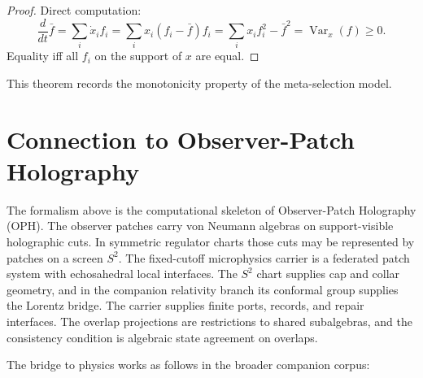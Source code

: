 \documentclass[11pt]{article}
\theoremstyle{remark}
\theoremstyle{plain}
\begin{document}
\begin{proof}
Direct computation:
\[
\frac{d}{dt}\bar{f}
=
\sum_i \dot{x}_i f_i
=
\sum_i x_i(f_i - \bar{f})f_i
=
\sum_i x_i f_i^2 - \bar{f}^2
=
\operatorname{Var}_x(f) \ge 0.
\]
Equality iff all $f_i$ on the support of $x$ are equal.
\end{proof}

This theorem records the monotonicity property of the meta-selection model.


\section{Connection to Observer-Patch Holography}

The formalism above is the computational skeleton of Observer-Patch Holography (OPH). The
observer patches carry von Neumann algebras on support-visible holographic cuts. In symmetric
regulator charts those cuts may be represented by patches on a screen \(S^2\). The fixed-cutoff
microphysics carrier is a federated patch system with echosahedral local interfaces. The \(S^2\)
chart supplies cap and collar geometry, and in the companion relativity branch its conformal group
supplies the Lorentz bridge. The carrier supplies finite ports, records, and repair interfaces. The
overlap projections are restrictions to shared subalgebras, and the consistency condition is
algebraic state agreement on overlaps.

The bridge to physics works as follows in the broader companion corpus:
\end{document}
